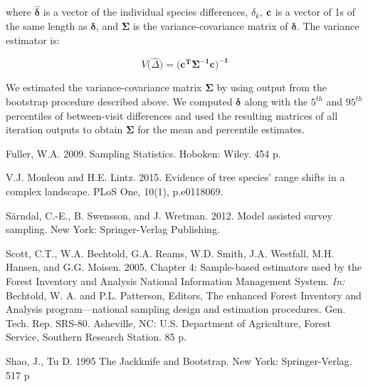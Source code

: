 \documentclass[12pt]{article}
\begin{document}
where $\hat{\boldsymbol{\delta}}$ is a vector of the individual species differences, $\hat{\delta}_k$, $\bold{c}$ is a vector of 1s of the same length as $\hat{\boldsymbol{\delta}}$, and $\mathbf{\Sigma}$ is the variance-covariance matrix of $\boldsymbol{\delta}$.  The variance estimator is: 

 \begin{equation} \label{eq:glsV}
V\big(\hat{\Delta}\big) = \big(\mathbf{c^T\Sigma^{-1}c\big)^{-1}}
\end{equation}

We estimated the variance-covariance matrix $\mathbf{\Sigma}$ by using output from the bootstrap procedure described above.  We computed $\boldsymbol{\delta}$ along with the $5^{th}$ and $95^{th}$ percentiles of between-visit differences and used the resulting matrices of all iteration outputs to obtain $\mathbf{\Sigma}$ for the mean and percentile estimates. 

\begin{thebibliography}{2}



 Fuller, W.A.  2009.  Sampling Statistics. Hoboken: Wiley. 454 p.

 V.J. Monleon and H.E. Lintz.  2015. Evidence of tree species’ range shifts in a complex landscape. PLoS One, 10(1), p.e0118069.

 S{\"a}rndal, C.-E., B. Swensson, and J. Wretman.  2012.  Model assisted survey sampling.  New York: Springer-Verlag Publishing.

 Scott, C.T., W.A. Bechtold, G.A. Reams, W.D. Smith, J.A. Westfall, M.H. Hansen, and G.G. Moisen.  2005.  Chapter 4: Sample-based estimators used by the Forest Inventory and Analysis National Information Management System.  \emph{In:} Bechtold, W. A. and P.L. Patterson, Editors, The enhanced Forest Inventory and Analysis program—national sampling design and estimation procedures. Gen. Tech. Rep. SRS-80. Asheville, NC: U.S. Department of Agriculture, Forest Service, Southern Research Station. 85 p.

 Shao, J., Tu D. 1995 The Jackknife and Bootstrap. New York: Springer-Verlag. 517 p

\end{thebibliography}
\end{document}

